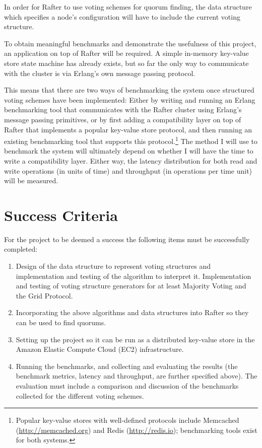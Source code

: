 \documentclass[12pt]{scrartcl}
\begin{document}
In order for Rafter to use voting schemes for quorum finding, the data structure which specifies a node's configuration will have to include the current voting structure.

To obtain meaningful benchmarks and demonstrate the usefulness of this project, an application on top of Rafter will be required. A simple in-memory key-value store state machine has already exists, but so far the only way to communicate with the cluster is via Erlang's own message passing protocol.

This means that there are two ways of benchmarking the system once structured voting schemes have been implemented: Either by writing and running an Erlang benchmarking tool that communicates with the Rafter cluster using Erlang's message passing primitives, or by first adding a compatibility layer on top of Rafter that implements a popular key-value store protocol, and then running an existing benchmarking tool that supports this protocol.\footnote{Popular key-value stores with well-defined protocols include Memcached (\url{http://memcached.org}) and Redis (\url{http://redis.io}); benchmarking tools exist for both systems.} The method I will use to benchmark the system will ultimately depend on whether I will have the time to write a compatibility layer. Either way, the latency distribution for both read and write operations (in units of time) and throughput (in operations per time unit) will be measured.

\section{Success Criteria%
  \label{success-criteria}%
}

For the project to be deemed a success the following items must be successfully completed:

\begin{enumerate}

\item Design of the data structure to represent voting structures and implementation and testing of the algorithm to interpret it. Implementation and testing of voting structure generators for at least Majority Voting and the Grid Protocol.

\item Incorporating the above algorithms and data structures into Rafter so they can be used to find quorums.

\item Setting up the project so it can be run as a distributed key-value store in the Amazon Elastic Compute Cloud (\textsc{EC2}) infrastructure.

\item Running the benchmarks, and collecting and evaluating the results (the benchmark metrics, latency and throughput, are further specified above). The evaluation must include a comparison and discussion of the benchmarks collected for the different voting schemes.


\end{enumerate}
\end{document}
